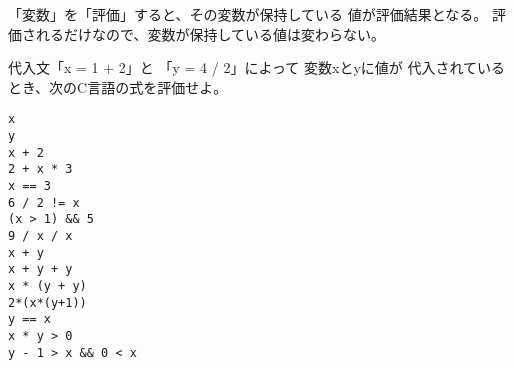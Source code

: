 \documentclass[12pt,a4j]{jarticle}
\newcounter{toi}
\def\toi{%
\bigskip\bigskip\noindent
\addtocounter{toi}{1}
\shadowbox{\bfseries\large 問\thetoi}
\nopagebreak[4]\bigskip\nopagebreak[4]
}
\begin{document}


\toi

「変数」を「評価」すると、その変数が保持している
値が評価結果となる。
評価されるだけなので、変数が保持している値は変わらない。




代入文「{\ttfamily x = 1 + 2}」と
「{\ttfamily y = 4 / 2}」によって
変数{\ttfamily x}と{\ttfamily y}に値が
代入されているとき、次のC言語の式を評価せよ。

\begin{multicols}{2}
\begin{verbatim}
x
y
x + 2
2 + x * 3
x == 3
6 / 2 != x
(x > 1) && 5
9 / x / x
x + y
x + y + y
x * (y + y)
2*(x*(y+1))
y == x
x * y > 0
y - 1 > x && 0 < x
\end{verbatim}
\end{multicols}








\toi
\end{document}
